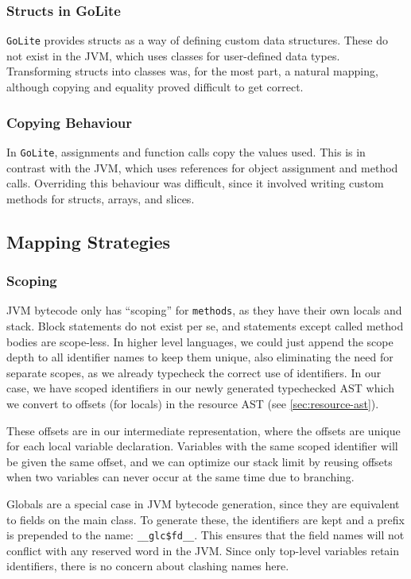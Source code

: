 \documentclass[11pt]{article}
\begin{document}
\subsubsection{Structs in GoLite}
\texttt{GoLite} provides structs as a way of defining custom data structures.
These do not exist in the JVM, which uses classes for user-defined data types.
Transforming structs into classes was, for the most part, a natural mapping,
although copying and equality proved difficult to get correct.

\subsubsection{Copying Behaviour}
In \texttt{GoLite}, assignments and function calls copy the values used.
This is in contrast with the JVM, which uses references for object assignment
and method calls. Overriding this behaviour was difficult, since it involved
writing custom methods for structs, arrays, and slices.

\subsection{Mapping Strategies}
\subsubsection{Scoping}
JVM bytecode only has ``scoping'' for \texttt{methods}, as they have
their own locals and stack. Block statements do not exist per se, and
statements except called method bodies are scope-less. In higher level
languages, we could just append the scope depth to all identifier
names to keep them unique, also eliminating the need for separate
scopes, as we already typecheck the correct use of identifiers. In our
case, we have scoped identifiers in our newly generated typechecked
AST which we convert to offsets (for locals) in the resource AST (see \ref{sec:resource-ast}).

These offsets are in our intermediate representation, where
the offsets are unique for each local variable declaration. Variables with
the same scoped identifier will be given the same offset, and we can
optimize our stack limit by reusing offsets when two variables can
never occur at the same time due to branching.

Globals are a special case in JVM bytecode generation, since they are
equivalent to fields on the main class. To generate these, the identifiers
are kept and a prefix is prepended to the name: \texttt{\_\_glc\$fd\_\_}. This
ensures that the field names will not conflict with any reserved word in
the JVM. Since only top-level variables retain identifiers, there is no
concern about clashing names here.
\end{document}
